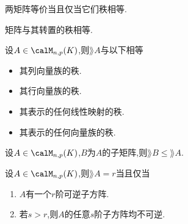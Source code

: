 \begin{cor}
    两矩阵等价当且仅当它们秩相等.
\end{cor}

\begin{cor}
    矩阵与其转置的秩相等.
\end{cor}

\begin{prop}
    设$A \in \calM_{n, p}(K)$,则$\rang A$与以下相等
    \begin{itemize}
        \item 其列向量族的秩.
        \item 其行向量族的秩.
        \item 其表示的任何线性映射的秩.
        \item 其表示的任何向量族的秩.
    \end{itemize}
\end{prop}

\begin{prop}
    设$A \in \calM_{n, p}(K)$,$B$为$A$的子矩阵,则$\rang B \leqslant \rang A$.
\end{prop}

\begin{prop}
    设$A \in \calM_{n, p}(K)$,则$\rang A = r$当且仅当
    \begin{enumerate}
        \item $A$有一个$r$阶可逆子方阵.
        \item 若$s > r$,则$A$的任意$s$阶子方阵均不可逆.
    \end{enumerate}
\end{prop}